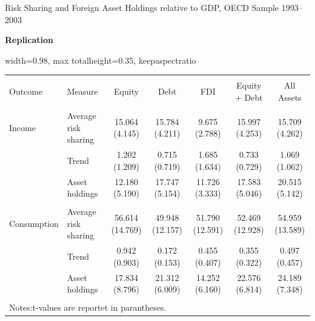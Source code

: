 \documentclass[aspectratio=169, 10pt]{beamer}
\begin{document}
\begin{frame}[t]{Risk Sharing and Foreign Asset Holdings relative to GDP, OECD Sample 1993--2003}
\vspace{0.18cm}

{\scriptsize \textbf{Replication}}

\vspace{0.04cm}

\begin{adjustbox}{
  width=0.98\textwidth,
  max totalheight=0.35\textheight,
  keepaspectratio
}
  \begin{tabular}{@{\extracolsep{3pt}}llccccc}
  \\[-1.8ex]\hline
  \hline \\[-1.8ex]
  Outcome 
  & Measure
  & Equity 
  & Debt 
  & FDI 
  & Equity + Debt 
  & All Assets \\
  \hline \\[-1.8ex]

  Income 
  & Average risk sharing 
  & 15.064 (4.145)
  & 15.784 (4.211)
  & 9.675 (2.788)
  & 15.997 (4.253)
  & 15.709 (4.262) \\

  & Trend 
  & 1.202 (1.209)
  & 0.715 (0.719)
  & 1.685 (1.634)
  & 0.733 (0.729)
  & 1.069 (1.062) \\

  & Asset holdings 
  & 12.180 (5.190)
  & 17.747 (5.154)
  & 11.726 (3.333)
  & 17.583 (5.046)
  & 20.515 (5.142) \\

  \hline \\[-1.8ex]

  Consumption 
  & Average risk sharing 
  & 56.614 (14.769)
  & 49.948 (12.157)
  & 51.790 (12.591)
  & 52.469 (12.928)
  & 54.959 (13.589) \\

  & Trend 
  & 0.942 (0.903)
  & 0.172 (0.153)
  & 0.455 (0.407)
  & 0.355 (0.322)
  & 0.497 (0.457) \\

  & Asset holdings 
  & 17.834 (8.796)
  & 21.312 (6.009)
  & 14.252 (6.160)
  & 22.576 (6.814)
  & 24.189 (7.348) \\

  \hline \\[-1.8ex]
  \multicolumn{7}{l}{\footnotesize Notes:t-values are reportet in parantheses.} \\
  \end{tabular}
\end{adjustbox}

\endgroup

\end{frame}
\end{document}
